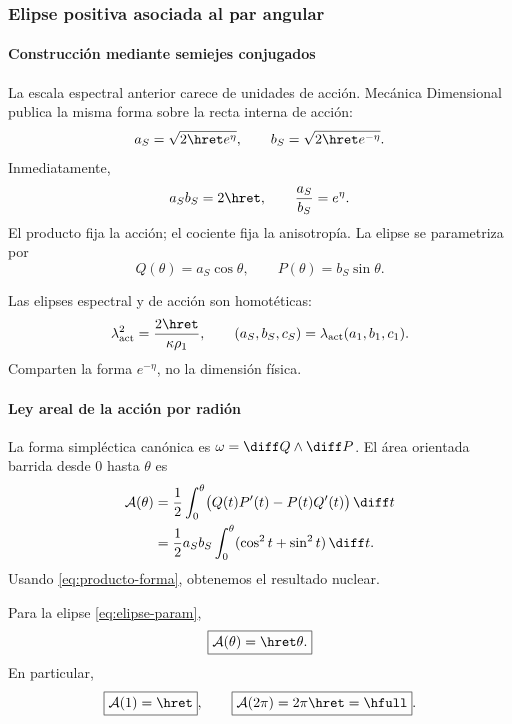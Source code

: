 \subsubsection{Elipse positiva asociada al par angular}

\paragraph{Construcción mediante semiejes conjugados}

La escala espectral anterior carece de unidades de acción. Mecánica
Dimensional publica la misma forma sobre la recta interna de acción:
\begin{equation}
a_S=\sqrt{2\hret e^\eta},
\qquad
b_S=\sqrt{2\hret e^{-\eta}}.
\label{eq:semiejes-accion}
\end{equation}
Inmediatamente,
\begin{equation}
a_Sb_S=2\hret,\qquad
\frac{a_S}{b_S}=e^\eta.
\label{eq:producto-forma}
\end{equation}
El producto fija la acción; el cociente fija la anisotropía. La elipse se
parametriza por
\begin{equation}
Q(\theta)=a_S\cos\theta,\qquad
P(\theta)=b_S\sin\theta.
\label{eq:elipse-param}
\end{equation}

Las elipses espectral y de acción son homotéticas:
\begin{equation}
\lambda_{\mathrm{act}}^2=\frac{2\hret}{\kappa\rho_1},
\qquad
(a_S,b_S,c_S)=\lambda_{\mathrm{act}}(a_1,b_1,c_1).
\label{eq:homotecia}
\end{equation}
Comparten la forma \(e^{-\eta}\), no la dimensión física.

\paragraph{Ley areal de la acción por radión}

La forma simpléctica canónica es \(\omega=\diff Q\wedge\diff P\). El área
orientada barrida desde \(0\) hasta \(\theta\) es
\begin{align}
\mathcal A(\theta)
&=\frac12\int_0^\theta
\bigl(Q(t)P'(t)-P(t)Q'(t)\bigr)\,\diff t\\
&=\frac12a_Sb_S\int_0^\theta
(\cos^2t+\sin^2t)\,\diff t.
\end{align}
Usando \eqref{eq:producto-forma}, obtenemos el resultado nuclear.

\begin{theorem}
Para la elipse \eqref{eq:elipse-param},
\begin{equation}
\boxed{\mathcal A(\theta)=\hret\theta.}
\label{eq:area-theorem}
\end{equation}
En particular,
\begin{equation}
\boxed{\mathcal A(1)=\hret},
\qquad
\boxed{\mathcal A(2\pi)=2\pi\hret=\hfull}.
\label{eq:area-radion-vuelta}
\end{equation}
\end{theorem}

